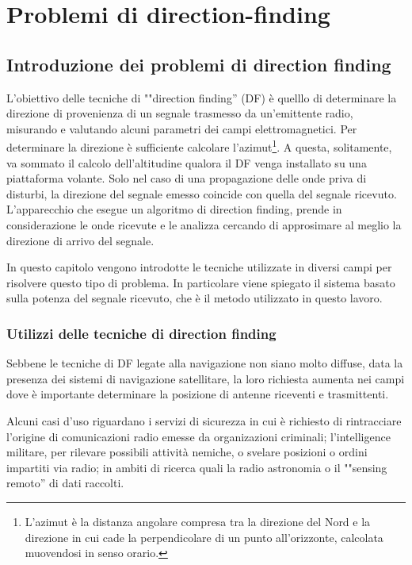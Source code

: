 \chapter{Problemi di direction-finding}
\section{Introduzione dei problemi di direction finding}

L'obiettivo delle tecniche di ""direction finding'' (DF) è quelllo di determinare la direzione di provenienza di un segnale trasmesso da un'emittente radio, misurando e valutando alcuni parametri dei campi elettromagnetici. Per determinare la direzione è sufficiente calcolare l'azimut\footnote{L'azimut è la distanza angolare compresa tra la direzione del Nord e la direzione in cui cade la perpendicolare di un punto all'orizzonte, calcolata muovendosi in senso orario.}. A questa, solitamente, va sommato il calcolo dell'altitudine qualora il DF venga installato su una piattaforma volante. Solo nel caso di una propagazione delle onde priva di disturbi, la direzione del segnale emesso coincide con quella del segnale ricevuto. L'apparecchio che esegue un algoritmo di direction finding, prende in considerazione le onde ricevute e le analizza cercando di approsimare al meglio la direzione di arrivo del segnale.

In questo capitolo vengono introdotte le tecniche utilizzate in diversi campi per risolvere questo tipo di problema. In particolare viene spiegato il sistema basato sulla potenza del segnale ricevuto, che è il metodo utilizzato in questo lavoro. 

\subsection{Utilizzi delle tecniche di direction finding}
Sebbene le tecniche di DF legate alla navigazione non siano molto diffuse, data la presenza dei sistemi di navigazione satellitare, la loro richiesta aumenta nei campi dove è importante determinare la posizione di antenne riceventi e trasmittenti. 

Alcuni casi d'uso riguardano i servizi di sicurezza in cui è richiesto di rintracciare l'origine di comunicazioni radio emesse da organizazioni criminali; l'intelligence militare, per rilevare possibili attività nemiche, o svelare posizioni o ordini impartiti via radio; in ambiti di ricerca quali la radio astronomia o il ""sensing remoto'' di dati raccolti. 

